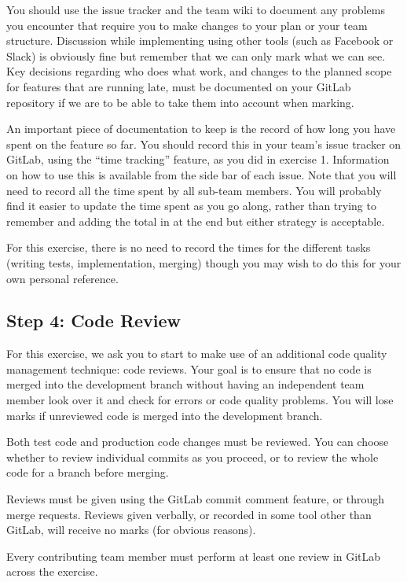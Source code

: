 \documentclass[
]{book}
\begin{document}
You should use the issue tracker and the team wiki to document any problems you encounter that require you to make changes to your plan or your team structure. Discussion while implementing using other tools (such as Facebook or Slack) is obviously fine but remember that we can only mark what we can see. Key decisions regarding who does what work, and changes to the planned scope for features that are running late, must be documented on your GitLab repository if we are to be able to take them into account when marking.

An important piece of documentation to keep is the record of how long you have spent on the feature so far. You should record this in your team's issue tracker on GitLab, using the ``time tracking'' feature, as you did in exercise 1. Information on how to use this is available from the side bar of each issue. Note that you will need to record all the time spent by all sub-team members. You will probably find it easier to update the time spent as you go along, rather than trying to remember and adding the total in at the end but either strategy is acceptable.

For this exercise, there is no need to record the times for the different tasks (writing tests, implementation, merging) though you may wish to do this for your own personal reference.

\hypertarget{codereview4}{%
\subsection{Step 4: Code Review}\label{codereview4}}

For this exercise, we ask you to start to make use of an additional code quality management technique: code reviews. Your goal is to ensure that no code is merged into the development branch without having an independent team member look over it and check for errors or code quality problems. You will lose marks if unreviewed code is merged into the development branch.

Both test code and production code changes must be reviewed. You can choose whether to review individual commits as you proceed, or to review the whole code for a branch before merging.

Reviews must be given using the GitLab commit comment feature, or through merge requests. Reviews given verbally, or recorded in some tool other than GitLab, will receive no marks (for obvious reasons).

Every contributing team member must perform at least one review in GitLab across the exercise.
\end{document}
